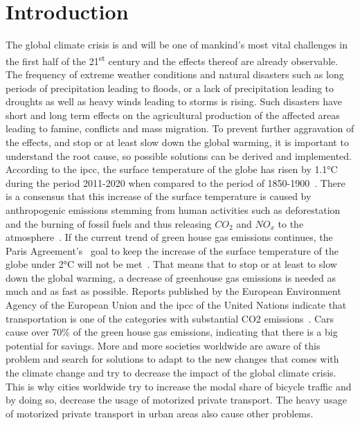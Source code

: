 \cleardoublepage
\chapter{Introduction}
\label{cha:introduction}
The global climate crisis is and will be one of mankind's most vital challenges in the first half of the 21\textsuperscript{st} century and the effects thereof are already observable.
The frequency of extreme weather conditions and natural disasters such as long periods of precipitation leading to floods, or a lack of precipitation leading to droughts as well as heavy winds leading to storms is rising.
Such disasters have short and long term effects on the agricultural production of the affected areas leading to famine, conflicts and mass migration.
To prevent further aggravation of the effects, and stop or at least slow down the global warming, it is important to understand the root cause, so possible solutions can be derived and implemented. 
According to the \ac{ipcc}, the surface temperature of the globe has risen by 1.1°C during the period 2011-2020 when compared to the period of 1850-1900~\cite{lee2023climate}.
There is a consensus that this increase of the surface temperature is caused by anthropogenic emissions stemming from human activities such as deforestation and the burning of fossil fuels and thus releasing $CO_{2}$ and $NO_{x}$ to the atmosphere~\cite{archer2010climate}.
If the current trend of green house gas emissions continues, the Paris Agreement's~\cite{un2015paris} goal to keep the increase of the surface temperature of the globe under 2°C will not be met~\cite{noah2023data}.
That means that to stop or at least to slow down the global warming, a decrease of greenhouse gas emissions is needed as much and as fast as possible.
Reports published by the European Environment Agency of the European Union and the \ac{ipcc} of the United Nations indicate that transportation is one of the categories with substantial CO2 emissions~\cite{lee2023climate2}.
Cars cause over 70\% of the green house gas emissions, indicating that there is a big potential for savings.
More and more societies worldwide are aware of this problem and search for solutions to adapt to the new changes that comes with the climate change and try to decrease the impact of the global climate crisis.
This is why cities worldwide try to increase the modal share of bicycle traffic and by doing so, decrease the usage of motorized private transport.
The heavy usage of motorized private transport in urban areas also cause other problems.

